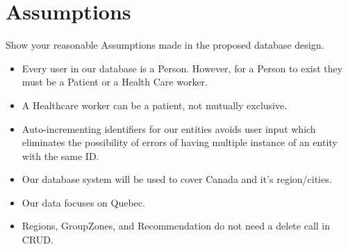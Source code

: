 \section{Assumptions}
Show your reasonable Assumptions made in the proposed database design.
\begin{itemize}
    \item Every user in our database is a Person. However, for a Person to exist they must be a Patient or a Health Care worker.
    \item A Healthcare worker can be a patient, not mutually exclusive.
    \item Auto-incrementing identifiers for our entities avoids user input which eliminates the possibility of errors of having multiple instance of an entity with the same ID.
    \item Our database system will be used to cover Canada and it's region/cities.
    \item Our data focuses on Quebec.
    \item Regions, GroupZones, and Recommendation do not need a delete call in CRUD.
\end{itemize}